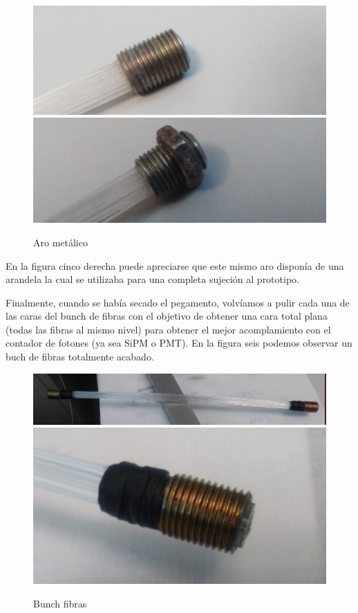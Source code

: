 \begin{figure}[htb]
\centering
{
\includegraphics[scale=0.3]{arometalico.png} 
}
{
\includegraphics[scale=0.3]{arometalicoconrosca.png} 
}
\caption{Aro metálico\label{Arofibra}}
\end{figure} 

En la figura cinco derecha puede apreciarse que este mismo aro disponía de una arandela la cual se utilizaba para una completa sujeción al prototipo.

Finalmente, cuando se había secado el pegamento, volvíamos a pulir cada una de las caras del bunch de fibras con el objetivo de obtener una cara total plana (todas las fibras al mismo nivel) para obtener el mejor acomplamiento con el contador de fotones (ya sea SiPM o PMT). En la figura seis podemos observar un buch de fibras totalmente acabado.

\begin{figure}[htb]
\centering
{
\includegraphics[scale=0.3]{bunchfibras.png} 
}
{
\includegraphics[scale=0.3]{bunchfibras1.png} 
}
\caption{Bunch fibras\label{Bunch}}
\end{figure} 

